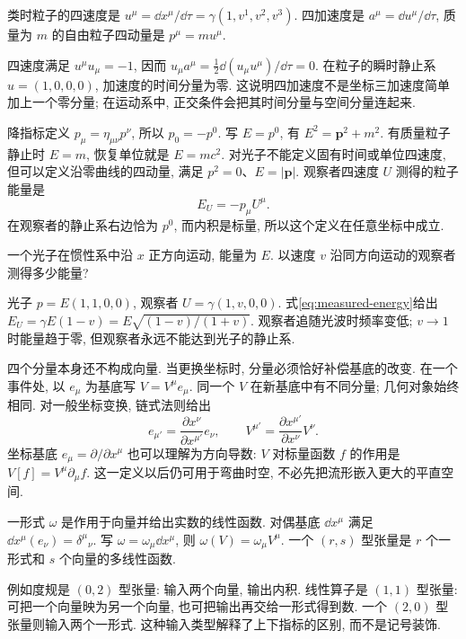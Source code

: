 \begin{definition}
类时粒子的四速度是 $u^\mu=\dd x^\mu/\dd\tau=\gamma(1,v^1,v^2,v^3)$. 四加速度是 $a^\mu=\dd u^\mu/\dd\tau$, 质量为 $m$ 的自由粒子四动量是 $p^\mu=mu^\mu$.
\end{definition}
四速度满足 $u^\mu u_\mu=-1$, 因而 $u_\mu a^\mu=\frac12\dd(u_\mu u^\mu)/\dd\tau=0$. 在粒子的瞬时静止系 $u=(1,0,0,0)$, 加速度的时间分量为零. 这说明四加速度不是坐标三加速度简单加上一个零分量; 在运动系中, 正交条件会把其时间分量与空间分量连起来.

降指标定义 $p_\mu=\eta_{\mu\nu}p^\nu$, 所以 $p_0=-p^0$. 写 $E=p^0$, 有 $E^2=\boldsymbol p^2+m^2$. 有质量粒子静止时 $E=m$, 恢复单位就是 $E=mc^2$. 对光子不能定义固有时间或单位四速度, 但可以定义沿零曲线的四动量, 满足 $p^2=0$、$E=|\boldsymbol p|$. 观察者四速度 $U$ 测得的粒子能量是
\begin{equation}\label{eq:measured-energy}
E_U=-p_\mu U^\mu.
\end{equation}
在观察者的静止系右边恰为 $p^0$, 而内积是标量, 所以这个定义在任意坐标中成立.

\begin{example}
一个光子在惯性系中沿 $x$ 正方向运动, 能量为 $E$. 以速度 $v$ 沿同方向运动的观察者测得多少能量?
\end{example}
\begin{solution}
光子 $p=E(1,1,0,0)$, 观察者 $U=\gamma(1,v,0,0)$. 式\eqref{eq:measured-energy}给出 $E_U=\gamma E(1-v)=E\sqrt{(1-v)/(1+v)}$. 观察者追随光波时频率变低; $v\to1$ 时能量趋于零, 但观察者永远不能达到光子的静止系.
\end{solution}

四个分量本身还不构成向量. 当更换坐标时, 分量必须恰好补偿基底的改变. 在一个事件处, 以 $e_\mu$ 为基底写 $V=V^\mu e_\mu$. 同一个 $V$ 在新基底中有不同分量; 几何对象始终相同. 对一般坐标变换, 链式法则给出
\begin{equation}\label{eq:vector-law}
e_{\mu'}=\frac{\partial x^\nu}{\partial x^{\mu'}}e_\nu,
\qquad V^{\mu'}=\frac{\partial x^{\mu'}}{\partial x^\nu}V^\nu.
\end{equation}
坐标基底 $e_\mu=\partial/\partial x^\mu$ 也可以理解为方向导数: $V$ 对标量函数 $f$ 的作用是 $V[f]=V^\mu\partial_\mu f$. 这一定义以后仍可用于弯曲时空, 不必先把流形嵌入更大的平直空间.

\begin{definition}
一形式 $\omega$ 是作用于向量并给出实数的线性函数. 对偶基底 $\dd x^\mu$ 满足 $\dd x^\mu(e_\nu)=\delta^\mu{}_\nu$. 写 $\omega=\omega_\mu\dd x^\mu$, 则 $\omega(V)=\omega_\mu V^\mu$. 一个 $(r,s)$ 型张量是 $r$ 个一形式和 $s$ 个向量的多线性函数.
\end{definition}
例如度规是 $(0,2)$ 型张量: 输入两个向量, 输出内积. 线性算子是 $(1,1)$ 型张量: 可把一个向量映为另一个向量, 也可把输出再交给一形式得到数. 一个 $(2,0)$ 型张量则输入两个一形式. 这种输入类型解释了上下指标的区别, 而不是记号装饰.

